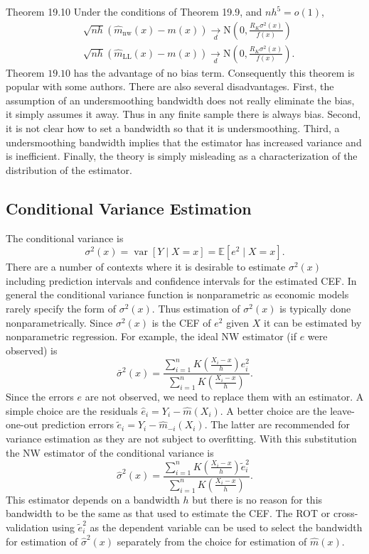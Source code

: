\documentclass[10pt]{article}
\begin{document}
Theorem 19.10 Under the conditions of Theorem 19.9, and $n h^{5}=o(1)$,
$$
\begin{aligned}
&\sqrt{n h}\left(\widehat{m}_{\mathrm{nw}}(x)-m(x)\right) \underset{d}{\longrightarrow} \mathrm{N}\left(0, \frac{R_{K} \sigma^{2}(x)}{f(x)}\right) \\
&\sqrt{n h}\left(\widehat{m}_{\mathrm{LL}}(x)-m(x)\right) \underset{d}{\longrightarrow} \mathrm{N}\left(0, \frac{R_{K} \sigma^{2}(x)}{f(x)}\right) .
\end{aligned}
$$
Theorem $19.10$ has the advantage of no bias term. Consequently this theorem is popular with some authors. There are also several disadvantages. First, the assumption of an undersmoothing bandwidth does not really eliminate the bias, it simply assumes it away. Thus in any finite sample there is always bias. Second, it is not clear how to set a bandwidth so that it is undersmoothing. Third, a undersmoothing bandwidth implies that the estimator has increased variance and is inefficient. Finally, the theory is simply misleading as a characterization of the distribution of the estimator.

\subsection{Conditional Variance Estimation}
The conditional variance is
$$
\sigma^{2}(x)=\operatorname{var}[Y \mid X=x]=\mathbb{E}\left[e^{2} \mid X=x\right] .
$$
There are a number of contexts where it is desirable to estimate $\sigma^{2}(x)$ including prediction intervals and confidence intervals for the estimated CEF. In general the conditional variance function is nonparametric as economic models rarely specify the form of $\sigma^{2}(x)$. Thus estimation of $\sigma^{2}(x)$ is typically done nonparametrically. Since $\sigma^{2}(x)$ is the CEF of $e^{2}$ given $X$ it can be estimated by nonparametric regression. For example, the ideal NW estimator (if $e$ were observed) is
$$
\bar{\sigma}^{2}(x)=\frac{\sum_{i=1}^{n} K\left(\frac{X_{i}-x}{h}\right) e_{i}^{2}}{\sum_{i=1}^{n} K\left(\frac{X_{i}-x}{h}\right)} .
$$
Since the errors $e$ are not observed, we need to replace them with an estimator. A simple choice are the residuals $\widehat{e}_{i}=Y_{i}-\widehat{m}\left(X_{i}\right)$. A better choice are the leave-one-out prediction errors $\widetilde{e}_{i}=Y_{i}-\widehat{m}_{-i}\left(X_{i}\right)$. The latter are recommended for variance estimation as they are not subject to overfitting. With this substitution the NW estimator of the conditional variance is
$$
\widehat{\sigma}^{2}(x)=\frac{\sum_{i=1}^{n} K\left(\frac{X_{i}-x}{h}\right) \widetilde{e}_{i}^{2}}{\sum_{i=1}^{n} K\left(\frac{X_{i}-x}{h}\right)} .
$$
This estimator depends on a bandwidth $h$ but there is no reason for this bandwidth to be the same as that used to estimate the CEF. The ROT or cross-validation using $\widetilde{e}_{i}^{2}$ as the dependent variable can be used to select the bandwidth for estimation of $\widehat{\sigma}^{2}(x)$ separately from the choice for estimation of $\widehat{m}(x)$.
\end{document}
